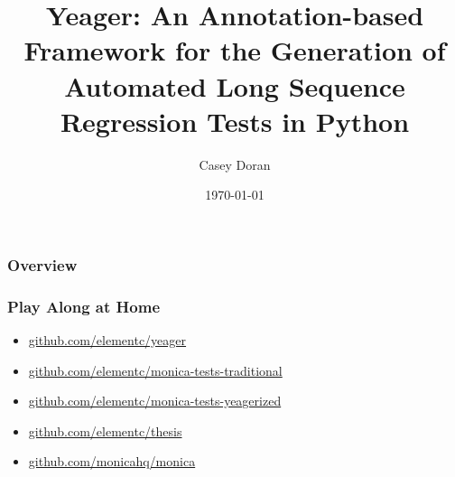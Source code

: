 \documentclass{beamer}
\title[Yeager]{Yeager: An Annotation-based Framework for the Generation of Automated Long Sequence Regression Tests in Python}
\author{Casey Doran}
\institute[Florida Tech]
{
Florida Institute of Technology \\
\medskip
\textit{cdoran2011@my.fit.edu}
}
\date{\today}
\begin{document}
\begin{frame}
\titlepage
\end{frame}

\begin{frame}
\frametitle{Overview}
\tableofcontents
\end{frame}

\begin{frame}
  \frametitle{Play Along at Home}
  \begin{itemize}
    \item \url{github.com/elementc/yeager}
    \item \url{github.com/elementc/monica-tests-traditional}
    \item \url{github.com/elementc/monica-tests-yeagerized}
    \item \url{github.com/elementc/thesis}
    \item \url{github.com/monicahq/monica}
  \end{itemize}
\end{frame}





\end{document}

